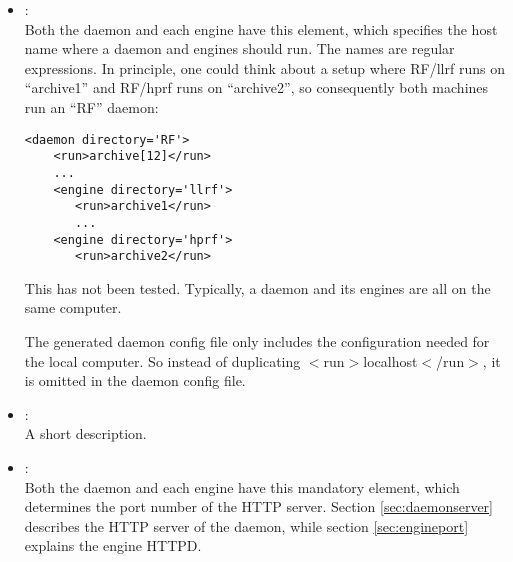 \begin{itemize}
\item {}:\\
      Both the daemon and each engine have this element, which
      specifies the host name where a daemon and engines should run.
      The names are regular expressions.
      In principle, one could think about a setup where
      RF/llrf runs on ``archive1'' and RF/hprf runs on
      ``archive2'', so consequently both machines run an
      ``RF'' daemon:
\begin{lstlisting}[keywordstyle=\sffamily]
 <daemon directory='RF'>
    <run>archive[12]</run>
    ...
    <engine directory='llrf'> 
       <run>archive1</run>
       ...
    <engine directory='hprf'> 
       <run>archive2</run>
\end{lstlisting}
      This has not been tested. Typically, a daemon and its engines
      are all on the same computer.

      The generated daemon config file only includes the configuration
      needed for the local computer.  So instead of duplicating
      $<$run$>$localhost$<$/run$>$, it is omitted in the daemon config file.
\item {}:\\
      A short description.
\item {}:\\
      Both the daemon and each engine have this mandatory element, which
      determines the port number of the HTTP server. Section
      \ref{sec:daemonserver} describes the HTTP server of the daemon, while
      section \ref{sec:engineport} explains the engine HTTPD.


\end{itemize}
